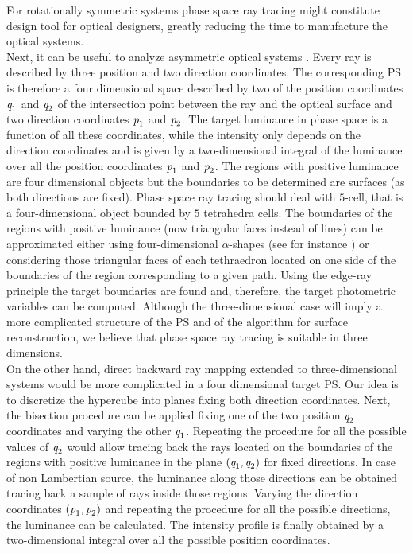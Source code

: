 For rotationally symmetric systems phase space ray tracing might constitute design tool for optical designers, greatly reducing the time to manufacture the optical systems. 
\\ \indent  Next, it can be useful to analyze asymmetric optical systems \cite{ries1997performance}. Every ray is described by three position and two direction coordinates. The corresponding PS is therefore a four dimensional space described by two of the position coordinates $\textit{q}_1$ and $\textit{q}_2$ of the intersection point between the ray and the optical surface and two direction coordinates $\textit{p}_1$ and $\textit{p}_2$. 
The target luminance in phase space is a function of all these coordinates, while the intensity only depends on the direction coordinates and is given by a two-dimensional integral of the luminance over all the position coordinates $\textit{p}_1$ and $\textit{p}_2$. The regions with positive luminance are four dimensional objects but the boundaries to be determined are surfaces (as both directions are fixed). Phase space ray tracing should deal with $5$-cell, that is a four-dimensional object bounded by $5$ tetrahedra cells. The boundaries of the regions with positive luminance (now triangular faces instead of lines) can be approximated either using four-dimensional $\alpha$-shapes (see for instance \cite{cazals2005conformal, teichmann1998surface}) or considering those triangular faces of each tethraedron located on one side of the boundaries of the region corresponding to a given path. Using the edge-ray principle the target boundaries are found and, therefore, the target photometric variables can be computed. Although the three-dimensional case will imply a more complicated structure of the PS and of the algorithm for surface reconstruction, we believe that phase space ray tracing is suitable in three dimensions. 
%
\\ \indent 
On the other hand, direct backward ray mapping extended to three-dimensional systems would be more complicated in a four dimensional target PS. Our idea is to discretize the hypercube into planes fixing both direction coordinates. Next, the bisection procedure can be applied fixing one of the two position $\textit{q}_2$ coordinates and varying the other $\textit{q}_1$. Repeating the procedure for all the possible values of $\textit{q}_2$ would allow tracing back the rays located on the boundaries of the regions with positive luminance in the plane $(\textit{q}_1, \textit{q}_2)$ for fixed directions. In case of non Lambertian source, the luminance along those directions can be obtained tracing back a sample of rays inside those regions. Varying the direction coordinates $(\textit{p}_1, \textit{p}_2)$ and repeating the procedure for all the possible directions, the luminance can be calculated. The intensity profile is finally obtained by a two-dimensional integral over all the possible position coordinates. 
